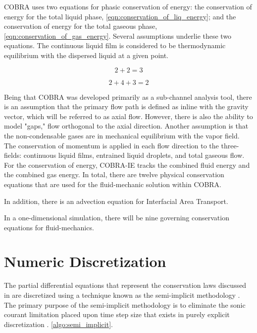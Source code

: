 COBRA uses two equations for phasic conservation of energy: the conservation of energy for the total liquid phase, \eqref{eqn:conservation_of_liq_energy}; and the conservation of energy for the total gaseous phase, \eqref{eqn:conservation_of_gas_energy}.
Several assumptions underlie these two equations.
The continuous liquid film is considered to be thermodynamic equilibrium with the dispersed liquid at a given point.

\begin{equation}
\label{eqn:conservation_of_liq_energy}
2 + 2 = 3
\end{equation} 

\begin{equation}
\label{eqn:conservation_of_gas_energy}
2 + 4  + 3 = 2
\end{equation}

Being that COBRA was developed primarily as a sub-channel analysis tool, there is an assumption that the primary flow path is defined as inline with the gravity vector, which will be referred to as axial flow.
However, there is also the ability to model "gaps," flow orthogonal to the axial direction.
Another assumption is that the non-condensable gases are in mechanical equilibrium with the vapor field.
The conservation of momentum is applied in each flow direction to the three-fields: continuous liquid films, entrained liquid droplets, and total gaseous flow.
For the conservation of energy, COBRA-IE tracks the combined fluid energy and the combined gas energy.
In total, there are twelve physical conservation equations that are used for the fluid-mechanic solution within COBRA.


In addition, there is an advection equation for Interfacial Area Transport.

In a one-dimensional simulation, there will be nine governing conservation equations for fluid-mechanics.




\section{Numeric Discretization}
\label{sect:numeric_methods}

The partial differential equations that represent the conservation laws discussed in  are discretized using a technique known as the semi-implicit methodology \cite{Liles1978}.
The primary purpose of the semi-implicit methodology is to eliminate the sonic courant limitation placed upon time step size that exists in purely explicit discretization \cite{someone}. \ref{algo:semi_implicit}.

